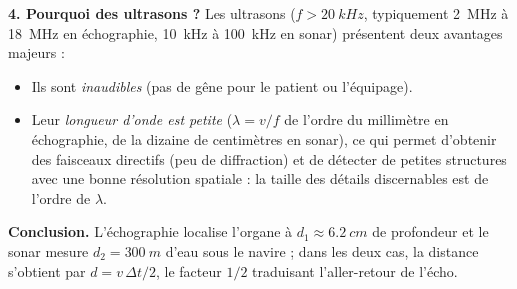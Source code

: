 \documentclass[11pt]{article}
\begin{document}
\begin{exoresolu}
\textbf{4. Pourquoi des ultrasons ?} Les ultrasons ($f > \SI{20}{kHz}$, typiquement \SI{2}{MHz} à \SI{18}{MHz} en échographie, \SI{10}{kHz} à \SI{100}{kHz} en sonar) présentent deux avantages majeurs :
\begin{itemize}
\item Ils sont \emph{inaudibles} (pas de gêne pour le patient ou l'équipage).
\item Leur \emph{longueur d'onde est petite} ($\lambda = v/f$ de l'ordre du millimètre en échographie, de la dizaine de centimètres en sonar), ce qui permet d'obtenir des faisceaux directifs (peu de diffraction) et de détecter de petites structures avec une bonne résolution spatiale : la taille des détails discernables est de l'ordre de $\lambda$.
\end{itemize}

\textbf{Conclusion.} L'échographie localise l'organe à $d_1 \approx \SI{6,2}{cm}$ de profondeur et le sonar mesure $d_2 = \SI{300}{m}$ d'eau sous le navire ; dans les deux cas, la distance s'obtient par $d = v\,\Delta t / 2$, le facteur $1/2$ traduisant l'aller-retour de l'écho.
\end{exoresolu}
\end{document}
